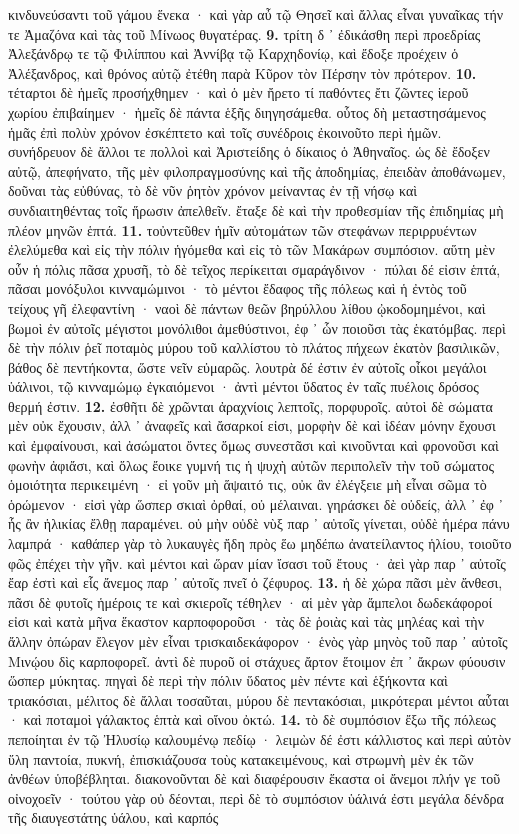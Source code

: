 \documentclass[a4paper, 11pt, oneside, polutonikogreek, german]{article}
\begin{document}
κινδυνεύσαντι τοῦ γάμου ἕνεκα · καὶ γὰρ αὖ τῷ Θησεῖ καὶ ἄλλας εἶναι γυναῖκας τήν τε Ἀμαζόνα καὶ τὰς τοῦ Μίνωος θυγατέρας. \textbf{9.} τρίτη δ ᾽ ἐδικάσθη περὶ προεδρίας Ἀλεξάνδρῳ τε τῷ Φιλίππου καὶ Ἀννίβᾳ τῷ Καρχηδονίῳ, καὶ ἔδοξε προέχειν ὁ Ἀλέξανδρος, καὶ θρόνος αὐτῷ ἐτέθη παρὰ Κῦρον τὸν Πέρσην τὸν πρότερον. \textbf{10.} τέταρτοι δὲ ἡμεῖς προσήχθημεν · καὶ ὁ μὲν ἤρετο τί παθόντες ἔτι ζῶντες ἱεροῦ χωρίου ἐπιβαίημεν · ἡμεῖς δὲ πάντα ἑξῆς διηγησάμεθα. οὗτος δὴ μεταστησάμενος ἡμᾶς ἐπὶ πολὺν χρόνον ἐσκέπτετο καὶ τοῖς συνέδροις ἐκοινοῦτο περὶ ἡμῶν. συνήδρευον δὲ ἄλλοι τε πολλοὶ καὶ Ἀριστείδης ὁ δίκαιος ὁ Ἀθηναῖος. ὡς δὲ ἔδοξεν αὐτῷ, ἀπεφήνατο, τῆς μὲν φιλοπραγμοσύνης καὶ τῆς ἀποδημίας, ἐπειδὰν ἀποθάνωμεν, δοῦναι τὰς εὐθύνας, τὸ δὲ νῦν ῥητὸν χρόνον μείναντας ἐν τῇ νήσῳ καὶ συνδιαιτηθέντας τοῖς ἥρωσιν ἀπελθεῖν. ἔταξε δὲ καὶ τὴν προθεσμίαν τῆς ἐπιδημίας μὴ πλέον μηνῶν ἑπτά. \textbf{11.} τοὐντεῦθεν ἡμῖν αὐτομάτων τῶν στεφάνων περιρρυέντων ἐλελύμεθα καὶ εἰς τὴν πόλιν ἡγόμεθα καὶ εἰς τὸ τῶν Μακάρων συμπόσιον. αὕτη μὲν οὖν ἡ πόλις πᾶσα χρυσῆ, τὸ δὲ τεῖχος περίκειται σμαράγδινον · πύλαι δέ εἰσιν ἑπτά, πᾶσαι μονόξυλοι κινναμώμινοι · τὸ μέντοι ἔδαφος τῆς πόλεως καὶ ἡ ἐντὸς τοῦ τείχους γῆ ἐλεφαντίνη · ναοὶ δὲ πάντων θεῶν βηρύλλου λίθου ᾠκοδομημένοι, καὶ βωμοὶ ἐν αὐτοῖς μέγιστοι μονόλιθοι ἀμεθύστινοι, ἐφ ᾽ ὧν ποιοῦσι τὰς ἑκατόμβας. περὶ δὲ τὴν πόλιν ῥεῖ ποταμὸς μύρου τοῦ καλλίστου τὸ πλάτος πήχεων ἑκατὸν βασιλικῶν, βάθος δὲ πεντήκοντα, ὥστε νεῖν εὐμαρῶς. λουτρὰ δέ ἐστιν ἐν αὐτοῖς οἶκοι μεγάλοι ὑάλινοι, τῷ κινναμώμῳ ἐγκαιόμενοι · ἀντὶ μέντοι ὕδατος ἐν ταῖς πυέλοις δρόσος θερμή ἐστιν. \textbf{12.} ἐσθῆτι δὲ χρῶνται ἀραχνίοις λεπτοῖς, πορφυροῖς. αὐτοὶ δὲ σώματα μὲν οὐκ ἔχουσιν, ἀλλ ᾽ ἀναφεῖς καὶ ἄσαρκοί εἰσι, μορφὴν δὲ καὶ ἰδέαν μόνην ἔχουσι καὶ ἐμφαίνουσι, καὶ ἀσώματοι ὄντες ὅμως συνεστᾶσι καὶ κινοῦνται καὶ φρονοῦσι καὶ φωνὴν ἀφιἄσι, καὶ ὅλως ἔοικε γυμνή τις ἡ ψυχὴ αὐτῶν περιπολεῖν τὴν τοῦ σώματος ὁμοιότητα περικειμένη · εἰ γοῦν μὴ ἅψαιτό τις, οὐκ ἂν ἐλέγξειε μὴ εἶναι σῶμα τὸ ὁρώμενον · εἰσὶ γὰρ ὥσπερ σκιαὶ ὀρθαί, οὐ μέλαιναι. γηράσκει δὲ οὐδείς, ἀλλ ᾽ ἐφ ᾽ ἧς ἂν ἡλικίας ἔλθῃ παραμένει. οὐ μὴν οὐδὲ νὺξ παρ ᾽ αὐτοῖς γίνεται, οὐδὲ ἡμέρα πάνυ λαμπρά · καθάπερ γὰρ τὸ λυκαυγὲς ἤδη πρὸς ἕω μηδέπω ἀνατείλαντος ἡλίου, τοιοῦτο φῶς ἐπέχει τὴν γῆν. καὶ μέντοι καὶ ὥραν μίαν ἴσασι τοῦ ἔτους · ἀεὶ γὰρ παρ ᾽ αὐτοῖς ἔαρ ἐστὶ καὶ εἷς ἄνεμος παρ ᾽ αὐτοῖς πνεῖ ὁ ζέφυρος. \textbf{13.} ἡ δὲ χώρα πᾶσι μὲν ἄνθεσι, πᾶσι δὲ φυτοῖς ἡμέροις τε καὶ σκιεροῖς τέθηλεν · αἱ μὲν γὰρ ἄμπελοι δωδεκάφοροί εἰσι καὶ κατὰ μῆνα ἕκαστον καρποφοροῦσι · τὰς δὲ ῥοιὰς καὶ τὰς μηλέας καὶ τὴν ἄλλην ὀπώραν ἔλεγον μὲν εἶναι τρισκαιδεκάφορον · ἑνὸς γὰρ μηνὸς τοῦ παρ ᾽ αὐτοῖς Μινῴου δὶς καρποφορεῖ. ἀντὶ δὲ πυροῦ οἱ στάχυες ἄρτον ἕτοιμον ἐπ ᾽ ἄκρων φύουσιν ὥσπερ μύκητας. πηγαὶ δὲ περὶ τὴν πόλιν ὕδατος μὲν πέντε καὶ ἑξήκοντα καὶ τριακόσιαι, μέλιτος δὲ ἄλλαι τοσαῦται, μύρου δὲ πεντακόσιαι, μικρότεραι μέντοι αὗται · καὶ ποταμοὶ γάλακτος ἑπτὰ καὶ οἴνου ὀκτώ. \textbf{14.} τὸ δὲ συμπόσιον ἔξω τῆς πόλεως πεποίηται ἐν τῷ Ἠλυσίῳ καλουμένῳ πεδίῳ · λειμὼν δέ ἐστι κάλλιστος καὶ περὶ αὐτὸν ὕλη παντοία, πυκνή, ἐπισκιάζουσα τοὺς κατακειμένους, καὶ στρωμνὴ μὲν ἐκ τῶν ἀνθέων ὑποβέβληται. διακονοῦνται δὲ καὶ διαφέρουσιν ἕκαστα οἱ ἄνεμοι πλήν γε τοῦ οἰνοχοεῖν · τούτου γὰρ οὐ δέονται, περὶ δὲ τὸ συμπόσιον ὑάλινά ἐστι μεγάλα δένδρα τῆς διαυγεστάτης ὑάλου, καὶ καρπός 
\end{document}
